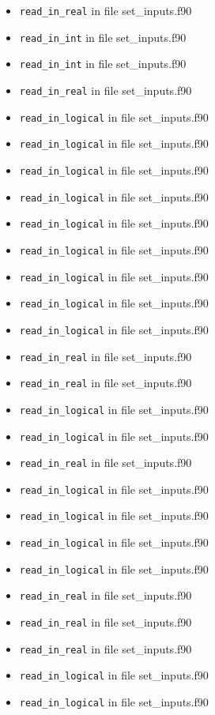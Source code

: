 \begin{itemize}
\begin{itemize}
    \item {\tt read\_in\_real} in file set\_inputs.f90
    \item {\tt read\_in\_int} in file set\_inputs.f90
    \item {\tt read\_in\_int} in file set\_inputs.f90
    \item {\tt read\_in\_real} in file set\_inputs.f90
    \item {\tt read\_in\_logical} in file set\_inputs.f90
    \item {\tt read\_in\_logical} in file set\_inputs.f90
    \item {\tt read\_in\_logical} in file set\_inputs.f90
    \item {\tt read\_in\_logical} in file set\_inputs.f90
    \item {\tt read\_in\_logical} in file set\_inputs.f90
    \item {\tt read\_in\_logical} in file set\_inputs.f90
    \item {\tt read\_in\_logical} in file set\_inputs.f90
    \item {\tt read\_in\_logical} in file set\_inputs.f90
    \item {\tt read\_in\_logical} in file set\_inputs.f90
    \item {\tt read\_in\_real} in file set\_inputs.f90
    \item {\tt read\_in\_real} in file set\_inputs.f90
    \item {\tt read\_in\_logical} in file set\_inputs.f90
    \item {\tt read\_in\_logical} in file set\_inputs.f90
    \item {\tt read\_in\_real} in file set\_inputs.f90
    \item {\tt read\_in\_logical} in file set\_inputs.f90
    \item {\tt read\_in\_logical} in file set\_inputs.f90
    \item {\tt read\_in\_logical} in file set\_inputs.f90
    \item {\tt read\_in\_logical} in file set\_inputs.f90
    \item {\tt read\_in\_real} in file set\_inputs.f90
    \item {\tt read\_in\_real} in file set\_inputs.f90
    \item {\tt read\_in\_real} in file set\_inputs.f90
    \item {\tt read\_in\_logical} in file set\_inputs.f90
    \item {\tt read\_in\_logical} in file set\_inputs.f90

\end{itemize}
\end{itemize}
